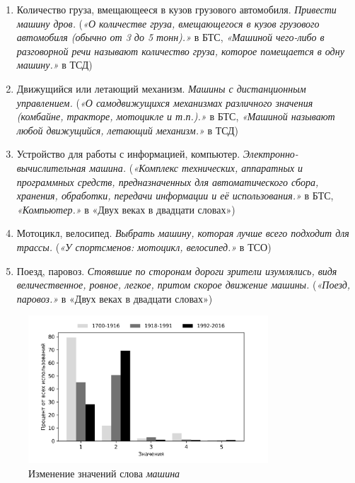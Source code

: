 \begin{enumerate}
    \item Количество груза, вмещающееся в кузов грузового автомобиля. \textit{Привести машину дров.}
(\textit{«О количестве груза, вмещающегося в кузов грузового автомобиля (обычно от 3 до 5 тонн).»} в БТС,
\textit{«Машиной чего-либо в разговорной речи называют количество груза, которое помещается в одну машину.»} в ТСД)

    \item Движущийся или летающий механизм. \textit{Машины с дистанционным управлением.}
(\textit{«О самодвижущихся механизмах различного значения (комбайне, тракторе, мотоцикле и т.п.).»} в БТС,
\textit{«Машиной называют любой движущийся, летающий механизм.»} в ТСД)

    \item Устройство для работы с информацией, компьютер. \textit{Электронно-вычислительная машина.}
(\textit{«Комплекс технических, аппаратных и программных средств, предназначенных для автоматического сбора, хранения, обработки, передачи информации и её использования.»} в БТС,
\textit{«Компьютер.»} в «Двух веках в двадцати словах»)

    \item Мотоцикл, велосипед. \textit{Выбрать машину, которая лучше всего подходит для трассы.}
(\textit{«У спортсменов: мотоцикл, велосипед.»} в ТСО)

    \item Поезд, паровоз. \textit{Стоявшие по сторонам дороги зрители изумлялись, видя величественное, ровное, легкое, притом скорое движение машины.}
(\textit{«Поезд, паровоз.»} в «Двух веках в двадцати словах»)
\end{enumerate}

\begin{figure}[H]
	\centering
	\includegraphics[width=0.8\textwidth]{img/visualizations/mashina_minimal}
	\caption{Изменение значений слова \textit{машина}}
	\label{fig:Машина}
\end{figure}

